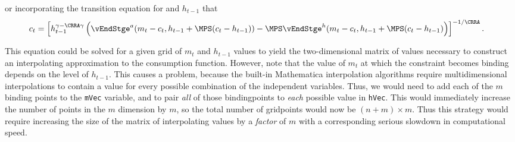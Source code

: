 \documentclass[\econtexRoot/SolvingMicroDSOPs]{subfiles}
\begin{document}
or incorporating the transition equation for
and $h_{t-1}$ that
\begin{equation}\begin{gathered}\begin{aligned}
  {c}_{t}  & = \left[h_{t-1}^{\gamma-\CRRA\gamma}
             \left(\vEndStge^{{a}}({m}_{t}-{c}_{t},h_{t-1}+\MPS({c}_{t}-h_{t-1}))
             -\MPS \vEndStge^{h}({m}_{t}-{c}_{t},h_{t-1}+\MPS({c}_{t}-h_{t-1})\right)
             \right]^{-1/\CRRA}. \nonumber
\end{aligned}\end{gathered}\end{equation}

This equation could be solved for a given grid of ${m}_{t}$ and
$h_{t-1}$ values to yield the two-dimensional matrix of values
necessary to construct an interpolating approximation to the
consumption function.  However, note that the value of ${m}_{t}$ at
which the constraint becomes binding depends on the level of
$h_{t-1}$.  This causes a problem, because the built-in {Mathematica}
interpolation algorithms require multidimensional interpolations to
contain a value for every possible combination of the independent
variables.  Thus, we would need to add each of the $m$ binding
points to the \texttt{mVec} variable, and to pair \textit{all} of
those bindingpoints to \textit{each} possible value in \texttt{hVec}.
This would immediately increase the number of points in the ${m}$
dimension by $m$, so the total number of gridpoints would now be
$(n+m) \times m$.  Thus this strategy would require increasing the
size of the matrix of interpolating values by a \textit{factor} of $m$
with a corresponding serious slowdown in computational speed.
\end{document}
